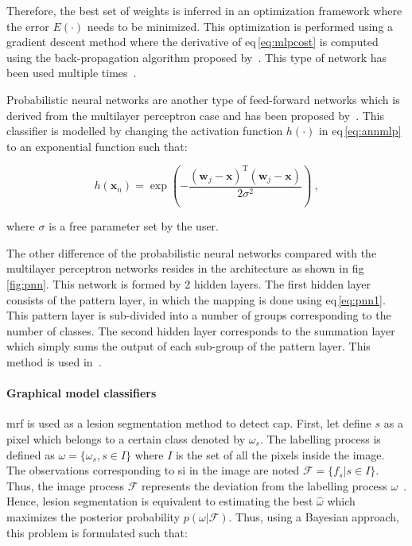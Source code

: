 Therefore, the best set of weights is inferred in an optimization framework where the error $E(\cdot)$ needs to be minimized.
This optimization is performed using a gradient descent method where the derivative of \acs{eq}\,\eqref{eq:mlpcost} is computed using the back-propagation algorithm proposed by~\cite{Rumelhart1988}.
This type of network has been used multiple times~\cite{Matulewicz2013,Parfait2012,trigui2017automatic,trigui2016classification,rampun2016computer}.



Probabilistic neural networks are another type of feed-forward networks which is derived from the multilayer perceptron case and has been proposed by~\cite{Specht1988}.
This classifier is modelled by changing the activation function $h(\cdot)$ in \acs{eq}\,\eqref{eq:annmlp} to an exponential function such that:

\begin{equation}
	h(\mathbf{x}_n) = \exp \left( - \frac{ (\mathbf{w}_j - \mathbf{x})^{\text{T}}(\mathbf{w}_j - \mathbf{x}) }{2\sigma^2} \right) \ ,
	\label{eq:pnn1}
\end{equation}

\noindent where $\sigma$ is a free parameter set by the user.

The other difference of the probabilistic neural networks compared with the multilayer perceptron networks resides in the architecture as shown in \acs{fig}\,\ref{fig:pnn}.
This network is formed by 2 hidden layers.
The first hidden layer consists of the pattern layer, in which the mapping is done using \acs{eq}\,\eqref{eq:pnn1}.
This pattern layer is sub-divided into a number of groups corresponding to the number of classes.
The second hidden layer corresponds to the summation layer which simply sums the output of each sub-group of the pattern layer.
This method is used in~\cite{Ampeliotis2007,Ampeliotis2008,Viswanath2011}.

\paragraph{Graphical model classifiers}
\Ac{mrf} is used as a lesion segmentation method to detect \ac{cap}.
First, let define $s$ as a pixel which belongs to a certain class denoted by $\omega_s$.
The labelling process is defined as $\omega = \{\omega_s, s \in I\}$ where $I$ is the set of all the pixels inside the image.
The observations corresponding to \ac{si} in the image are noted $\mathcal{F} = \{ f_s | s \in I \}$.
Thus, the image process $\mathcal{F}$ represents the deviation from the labelling process $\omega$~\cite{Kato2001}.
Hence, lesion segmentation is equivalent to estimating the best $\hat{\omega}$ which maximizes the posterior probability $p(\omega|\mathcal{F})$.
Thus, using a Bayesian approach, this problem is formulated such that:

